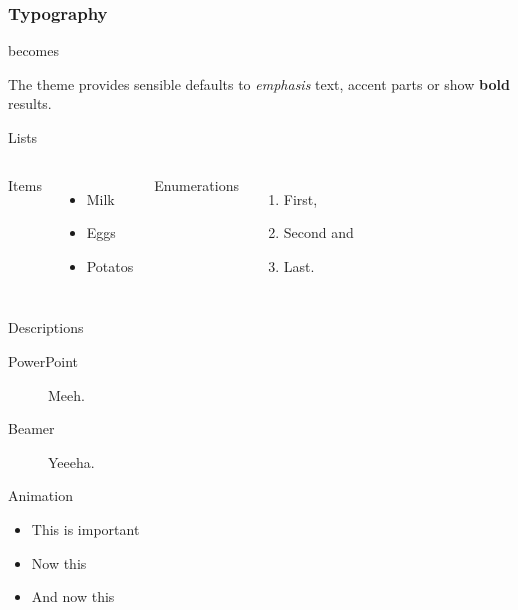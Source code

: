 \documentclass[10pt, compress]{beamer}
\begin{document}
\begin{frame}[fragile]
  \frametitle{Typography}


  \begin{center}becomes\end{center}

  The theme provides sensible defaults to \emph{emphasis} text,
  \alert{accent} parts or show \textbf{bold} results.
\end{frame}
\begin{frame}{Lists}
  \begin{columns}[onlytextwidth]
      Items
      \begin{itemize}
        \item Milk \item Eggs \item Potatos
      \end{itemize}

      Enumerations
      \begin{enumerate}
        \item First, \item Second and \item Last.
      \end{enumerate}
  \end{columns}
\end{frame}
\begin{frame}{Descriptions}
  \begin{description}
    \item[PowerPoint] Meeh.
    \item[Beamer] Yeeeha.
  \end{description}
\end{frame}
\begin{frame}{Animation}
  \begin{itemize}[<+- | alert@+>]
    \item \alert<4>{This is important}
    \item Now this
    \item And now this
  \end{itemize}
\end{frame}
\end{document}

